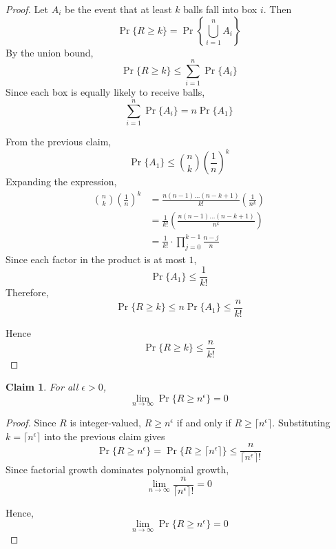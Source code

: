 \documentclass{article}
\newtheorem{claim}{Claim}
\begin{document}
\begin{proof}
    Let $A_i$ be the event that at least $k$ balls fall into box $i$. Then
    \[
    \Pr\{R \geq k\} = \Pr\left\{\bigcup_{i=1}^{n}A_i\right\}
    \]
    By the union bound,
    \[
    \Pr\{R \geq k\} \leq \sum_{i=1}^{n}\Pr\{A_i\}
    \]
    Since each box is equally likely to receive balls,
    \[
    \sum_{i=1}^{n}\Pr\{A_i\} = n\Pr\{A_1\}
    \]

    \medskip

    From the previous claim, 
    \[
    \Pr\{A_1\} \leq \binom{n}{k}\left(\frac{1}{n}\right)^k
    \]
    Expanding the expression, 
    \[
    \begin{aligned}
    \binom{n}{k}\left(\frac{1}{n}\right)^k &= \frac{n(n - 1)\dots(n - k + 1)}{k!}\left(\frac{1}{n^k}\right) \\
    &= \frac{1}{k!}\left(\frac{n(n - 1)\dots(n - k + 1)}{n^k}\right) \\
    &= \frac{1}{k!} \cdot \prod_{j=0}^{k-1}\frac{n-j}{n}
    \end{aligned}
    \]
    Since each factor in the product is at most $1$,
    \[
    \Pr\{A_1\} \leq \frac{1}{k!}
    \]
    Therefore, 
    \[
    \Pr\{R \geq k\} \leq n\Pr\{A_1\} \leq \frac{n}{k!}
    \]

    \medskip

    Hence 
    \[
    \Pr\{R \geq k\} \leq \frac{n}{k!}
    \]
\end{proof}

\begin{claim}
    For all $\epsilon > 0$,
    \[
    \lim_{n \to \infty}\Pr\{R \geq n^\epsilon\} = 0
    \]
\end{claim}

\begin{proof}
    Since $R$ is integer-valued, $R \geq n^\epsilon$ if and only if $R \geq \lceil n^\epsilon \rceil$. 
    Substituting $k = \lceil n^\epsilon \rceil$ into the previous claim gives
    \[
    \Pr\{R \geq n^\epsilon\} = \Pr\{R \geq \lceil n^\epsilon \rceil\} \leq \frac{n}{\lceil n^\epsilon \rceil!}
    \]
    Since factorial growth dominates polynomial growth,
    \[
    \lim_{n \to \infty}\frac{n}{\lceil n^\epsilon \rceil!} = 0
    \]

    \medskip

    Hence,
    \[
    \lim_{n \to \infty}\Pr\{R \geq n^\epsilon\} = 0
    \]
\end{proof}
\end{document}
